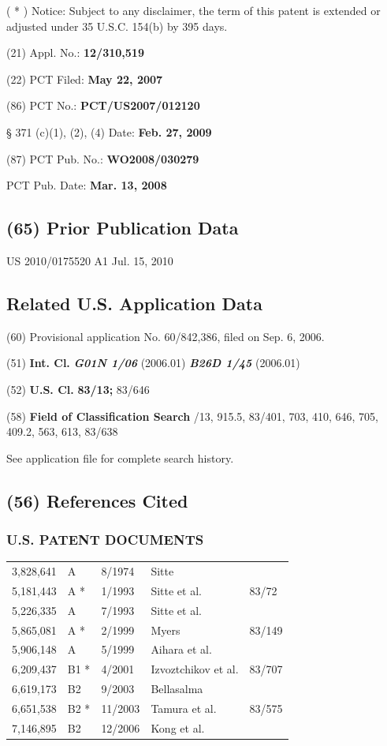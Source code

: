 \documentclass{article}
\begin{document}
( * ) Notice: Subject to any disclaimer, the term of this patent is extended or adjusted under 35 U.S.C. 154(b) by 395 days.

(21) Appl. No.: \textbf{12/310,519}

(22) PCT Filed: \textbf{May 22, 2007}

(86) PCT No.: \textbf{PCT/US2007/012120}

§ 371 (c)(1), (2), (4) Date: \textbf{Feb. 27, 2009}

(87) PCT Pub. No.: \textbf{WO2008/030279}

PCT Pub. Date: \textbf{Mar. 13, 2008}

\subsection*{(65) Prior Publication Data}

US 2010/0175520 A1 Jul. 15, 2010

\subsection*{Related U.S. Application Data}

(60) Provisional application No. 60/842,386, filed on Sep. 6, 2006.

(51) \textbf{Int. Cl.} \textbf{\textit{G01N 1/06}} (2006.01) \textbf{\textit{B26D 1/45}} (2006.01)

(52) \textbf{U.S. Cl.} \dotfill \textbf{83/13;} 83/646

(58) \textbf{Field of Classification Search} /13, 915.5, 83/401, 703, 410, 646, 705, 409.2, 563, 613, 83/638

See application file for complete search history.

\subsection*{(56) References Cited}

\subsubsection*{U.S. PATENT DOCUMENTS}

\begin{center}
\begin{tabular}{@{}lllll@{}}
3,828,641 & A & 8/1974 & Sitte & \\
5,181,443 & A * & 1/1993 & Sitte et al. & 83/72\\
5,226,335 & A & 7/1993 & Sitte et al. & \\
5,865,081 & A * & 2/1999 & Myers & 83/149\\
5,906,148 & A & 5/1999 & Aihara et al. & \\
6,209,437 & B1 * & 4/2001 & Izvoztchikov et al. & 83/707\\
6,619,173 & B2 & 9/2003 & Bellasalma & \\
6,651,538 & B2 * & 11/2003 & Tamura et al. & 83/575\\
7,146,895 & B2 & 12/2006 & Kong et al. & \\
\end{tabular}
\end{center}
\end{document}
